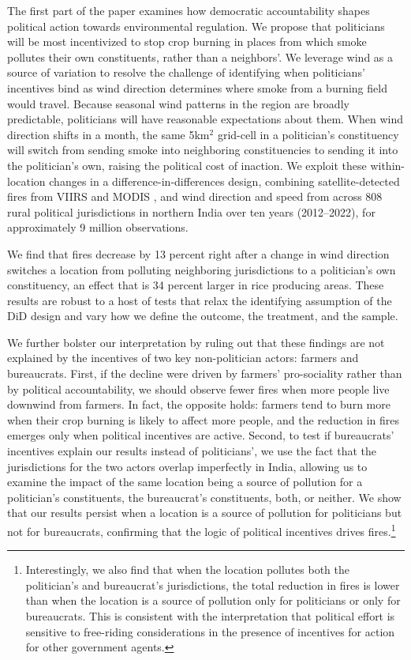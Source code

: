 \documentclass[12pt]{article}
\begin{document}
The first part of the paper examines how democratic accountability shapes political action towards environmental regulation. We propose that politicians will be most incentivized to stop crop burning in places from which smoke pollutes their own constituents, rather than a neighbors'. We leverage wind as a source of variation to resolve the challenge of identifying when politicians' incentives bind as wind direction determines where smoke from a burning field would travel. Because seasonal wind patterns in the region are broadly predictable, politicians will have reasonable expectations about them. When wind direction shifts in a month, the same 5km$^2$ grid-cell in a politician's constituency will switch from sending smoke into neighboring constituencies to sending it into the politician's own, raising the political cost of inaction. We exploit these within-location changes in a difference-in-differences design, combining satellite-detected fires from VIIRS and MODIS \citep{VIIRS_Instrument_Overview}, and wind direction and speed from \citet{ERA5_monthly_pressure_levels_2023} across 808 rural political jurisdictions in northern India over ten years (2012–2022), for approximately 9 million observations.


We find that fires decrease by 13 percent right after a change in wind direction switches a location from polluting neighboring jurisdictions to a politician's own constituency, an effect that is 34 percent larger in rice producing areas. These results are robust to a host of tests that relax the identifying assumption of the DiD design and vary how we define the outcome, the treatment, and the sample.

We further bolster our interpretation by ruling out that these findings are not explained by the incentives of two key non-politician actors: farmers and bureaucrats. First, if the decline were driven by farmers’ pro-sociality rather than by political accountability, we should observe fewer fires when more people live downwind from farmers. In fact, the opposite holds: farmers tend to burn more when their crop burning is likely to affect more people, and the reduction in fires emerges only when political incentives are active. Second, to test if bureaucrats' incentives explain our results instead of politicians', we use the fact that the jurisdictions for the two actors overlap imperfectly in India, allowing us to examine the impact of the same location being a source of pollution for a politician's constituents, the bureaucrat's constituents, both, or neither. We show that our results persist when a location is a source of pollution for politicians but not for bureaucrats, confirming that the logic of political incentives drives fires.\footnote{Interestingly, we also find that when the location pollutes both the politician's and bureaucrat's jurisdictions, the total reduction in fires is lower than when the location is a source of pollution only for politicians or only for bureaucrats. This is consistent with the interpretation that political effort is sensitive to free-riding considerations in the presence of incentives for action for other government agents.} 
\end{document}
